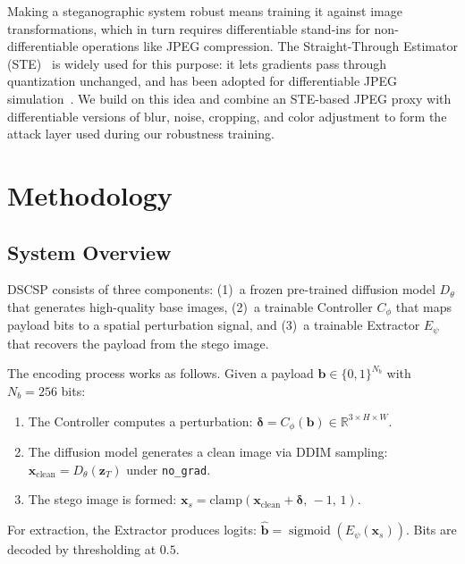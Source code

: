 \documentclass[conference]{IEEEtran}
\newcommand{\R}{\mathbb{R}}
\DeclareMathOperator{\sigmoid}{sigmoid}
\begin{document}
Making a steganographic system robust means training it against image transformations, which in turn requires differentiable stand-ins for non-differentiable operations like JPEG compression.
The Straight-Through Estimator (STE)~\cite{bengio2013estimating} is widely used for this purpose: it lets gradients pass through quantization unchanged, and has been adopted for differentiable JPEG simulation~\cite{shin2017jpeg}.
We build on this idea and combine an STE-based JPEG proxy with differentiable versions of blur, noise, cropping, and color adjustment to form the attack layer used during our robustness training.


\section{Methodology}
\label{sec:method}

\subsection{System Overview}
\label{sec:overview}

DSCSP consists of three components: (1)~a frozen pre-trained diffusion model $D_\theta$ that generates high-quality base images, (2)~a trainable Controller $C_\phi$ that maps payload bits to a spatial perturbation signal, and (3)~a trainable Extractor $E_\psi$ that recovers the payload from the stego image.

The encoding process works as follows.
Given a payload $\mathbf{b} \in \{0,1\}^{N_b}$ with $N_b = 256$ bits:
\begin{enumerate}[itemsep=1pt, topsep=2pt]
    \item The Controller computes a perturbation: $\bm{\delta} = C_\phi(\mathbf{b}) \in \R^{3 \times H \times W}$.
    \item The diffusion model generates a clean image via DDIM sampling: $\mathbf{x}_\text{clean} = D_\theta(\mathbf{z}_T)$ under \texttt{no\_grad}.
    \item The stego image is formed: $\mathbf{x}_s = \text{clamp}(\mathbf{x}_\text{clean} + \bm{\delta},\, -1,\, 1)$.
\end{enumerate}
For extraction, the Extractor produces logits: $\hat{\mathbf{b}} = \sigmoid(E_\psi(\mathbf{x}_s))$.
Bits are decoded by thresholding at $0.5$.
\end{document}
